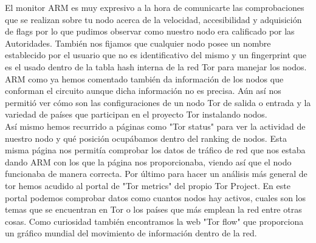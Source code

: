 El monitor ARM es muy expresivo a la hora de comunicarte las comprobaciones que se realizan sobre tu nodo acerca de la velocidad, accesibilidad y adquisición de flags por lo que pudimos observar como nuestro nodo era calificado por las Autoridades. También nos fijamos que cualquier nodo posee un nombre establecido por el usuario que no es identificativo del mismo y un fingerprint que es el usado dentro de la tabla hash interna de la red Tor para manejar los nodos.\\
ARM como ya hemos comentado también da información de los nodos que conforman el circuito aunque dicha información no es precisa. Aún así nos permitió ver cómo son las configuraciones de un nodo Tor de salida o entrada y la variedad de países que participan en el proyecto Tor instalando nodos.\\
Así mismo hemos recurrido a páginas como "Tor status" para ver la actividad de nuestro nodo y qué posición ocupábamos dentro del ranking de nodos. Esta misma página nos permitía comprobar los datos de tráfico de red que nos estaba dando ARM con los que la página nos proporcionaba, viendo así que el nodo funcionaba de manera correcta. Por último para hacer un análisis más general de tor hemos acudido al portal de "Tor metrics" del propio Tor Project. En este portal podemos comprobar datos como cuantos nodos hay activos, cuales son los temas que se encuentran en Tor o los países que más emplean la red entre otras cosas. Como curiosidad también encontramos la web "Tor flow" que proporciona un gráfico mundial del movimiento de información dentro de la red.